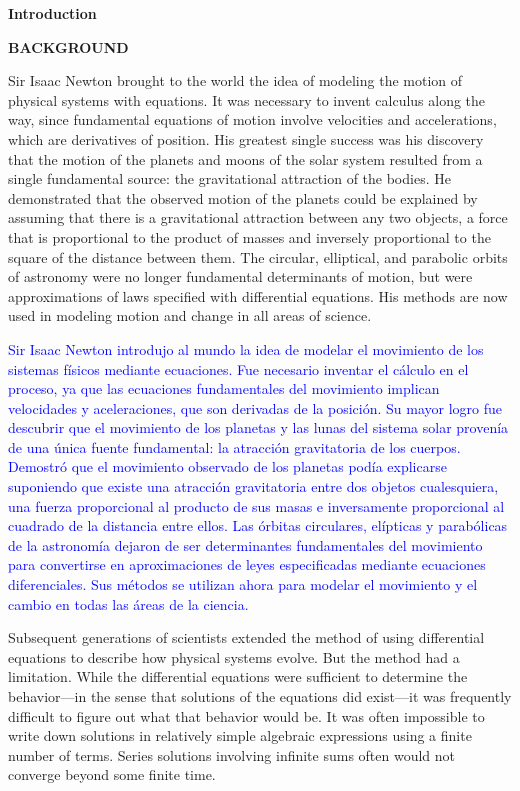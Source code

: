 \documentclass[12pt]{article}
\begin{document}
\textbf{Introduction}

\hfill

\textbf{BACKGROUND}

\hfill

Sir Isaac Newton brought to the world the idea of modeling the motion of physical systems with equations. 
It was necessary to invent calculus along the way, since fundamental equations of motion involve velocities 
and accelerations, which are derivatives of position. His greatest single success was his discovery that 
the motion of the planets and moons of the solar system resulted from a single fundamental source: the 
gravitational attraction of the bodies. He demonstrated that the observed motion of the planets could be 
explained by assuming that there is a gravitational attraction between any two objects, a force that is 
proportional to the product of masses and inversely proportional to the square of the distance between 
them. The circular, elliptical, and parabolic orbits of astronomy were no longer fundamental determinants 
of motion, but were approximations of laws specified with differential 
equations. His methods are now used in modeling motion and change in all areas of science.

\textcolor{blue}{Sir Isaac Newton introdujo al mundo la idea de modelar el movimiento de los sistemas físicos mediante ecuaciones. Fue necesario 
inventar el cálculo en el proceso, ya que las ecuaciones fundamentales del movimiento implican velocidades y aceleraciones, que son derivadas de la 
posición. Su mayor logro fue descubrir que el movimiento de los planetas y las lunas del sistema solar provenía de una única fuente fundamental: la 
atracción gravitatoria de los cuerpos. Demostró que el movimiento observado de los planetas podía explicarse suponiendo que existe una atracción 
gravitatoria entre dos objetos cualesquiera, una fuerza proporcional al producto de sus masas e inversamente proporcional al cuadrado de la distancia 
entre ellos. Las órbitas circulares, elípticas y parabólicas de la astronomía dejaron de ser determinantes fundamentales del movimiento para 
convertirse en aproximaciones de leyes especificadas mediante ecuaciones diferenciales. Sus métodos se utilizan ahora para modelar el movimiento y el 
cambio en todas las áreas de la ciencia.}


Subsequent generations of scientists extended the method of using differential equations to describe how 
physical systems evolve. But the method had a limitation. While the differential equations were sufficient 
to determine the behavior—in the sense that solutions of the equations did exist—it was frequently 
difficult to figure out what that behavior would be. It was often impossible to write down solutions in 
relatively simple algebraic expressions using a finite number of terms. Series solutions involving infinite 
sums often would not converge beyond some finite time.
\end{document}
